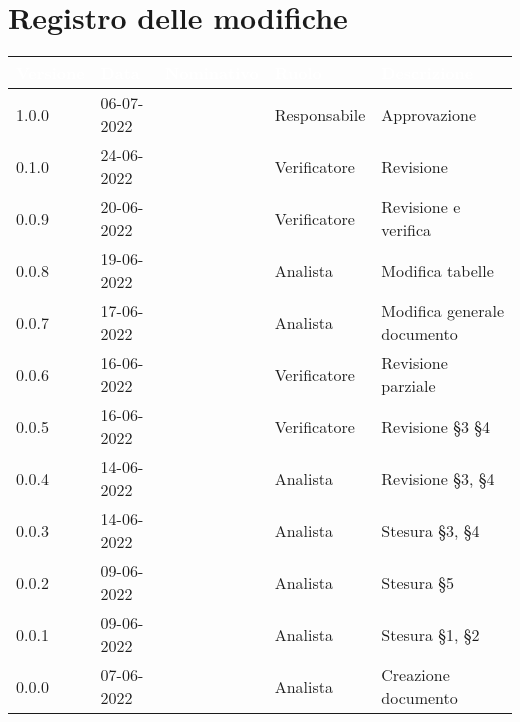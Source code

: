 \section*{Registro delle modifiche}
{

\newlength{\freewidth}
\setlength{\freewidth}{\dimexpr\textwidth-10\tabcolsep}
\renewcommand{\arraystretch}{1.5}
\centering
\setlength{\aboverulesep}{0pt}
\setlength{\belowrulesep}{0pt}
\begin{longtable}{C{.13\freewidth} C{.15\freewidth} C{.26\freewidth} C{.18\freewidth} C{.282379\freewidth}}
	\toprule
{}
\textcolor{white}{\textbf{Versione}}&
\textcolor{white}{\textbf{Data}}&
\textcolor{white}{\textbf{Nominativo}}&
\textcolor{white}{\textbf{Ruolo}}&
\textcolor{white}{\textbf{Descrizione}}\\	
\toprule
\endhead


1.0.0 & 06-07-2022 & \marcov{} & Responsabile & Approvazione \\
0.1.0 & 24-06-2022 & \giulio{} & Verificatore & Revisione \\
0.0.9 & 20-06-2022 & \angela{} & Verificatore & Revisione e verifica \\
0.0.8 & 19-06-2022 & \matteo{} & Analista & Modifica tabelle \\
0.0.7 & 17-06-2022 & \matteo{} & Analista & Modifica generale documento \\
0.0.6 & 16-06-2022 & \angela{} & Verificatore & Revisione parziale \\
0.0.5 & 16-06-2022 & \marcob{} & Verificatore & Revisione \S 3 \S 4 \\
0.0.4 & 14-06-2022 & \matteo{} & Analista & Revisione \S 3, \S 4\\
0.0.3 & 14-06-2022 & \ruth{} & Analista & Stesura \S 3, \S 4\\
0.0.2 & 09-06-2022 & \matteo{} & Analista & Stesura \S 5\\
0.0.1 & 09-06-2022 & \marcob{} & Analista & Stesura \S 1, \S 2\\
0.0.0 & 07-06-2022 & \matteo{} & Analista & Creazione documento\\	
\bottomrule
\end{longtable}
}
